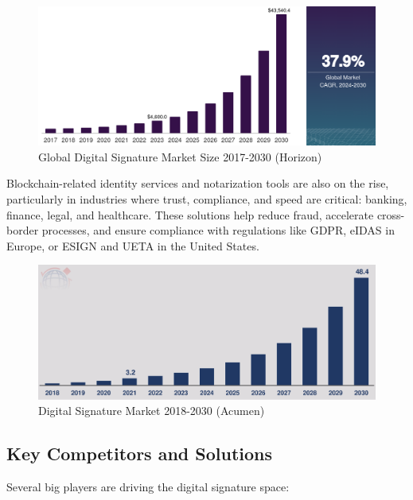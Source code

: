 \begin{figure}[H]
    \centering
    \includegraphics[width=18cm]{images/market-growth.png}
    \caption{Global Digital Signature Market Size 2017-2030 (Horizon)}
    \label{market-growth}
\end{figure}

Blockchain-related identity services and notarization tools are also on the rise, particularly in industries where trust, compliance, and speed are critical: banking, finance, legal, and healthcare. These solutions help reduce fraud, accelerate cross-border processes, and ensure compliance with regulations like GDPR, eIDAS in Europe, or ESIGN and UETA in the United States.

\begin{figure}[H]
    \centering
    \includegraphics[width=18cm]{images/market-growth-2.png}
    \caption{Digital Signature Market 2018-2030 (Acumen)}
    \label{market-growth-2}
\end{figure}

\subsection{Key Competitors and Solutions}
Several big players are driving the digital signature space:

